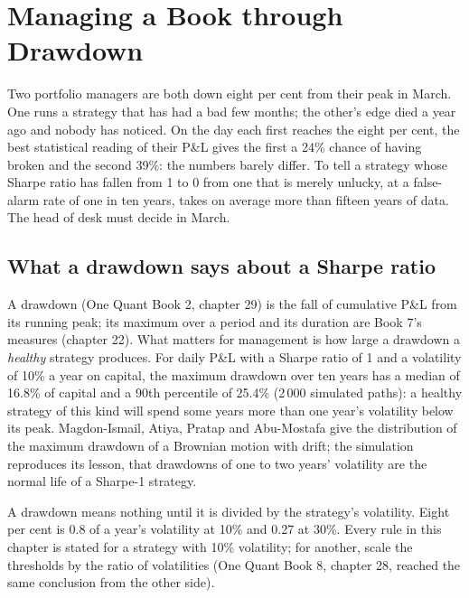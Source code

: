 \chapter{Managing a Book through Drawdown}\label{ch:fm:managing-a-book-through-drawdown}

Two portfolio managers are both down eight per cent from their peak in March. One runs a strategy that has had a bad few months; the other's
edge died a year ago and nobody has noticed. On the day each first reaches the eight per cent, the best statistical reading of their P\&L gives
the first a 24\% chance of having broken and the second 39\%: the numbers barely differ. To tell a strategy whose Sharpe ratio has fallen from 1
to 0 from one that is merely unlucky, at a false-alarm rate of one in ten years, takes on average more than fifteen years of data. The head of desk
must decide in March.

\section{What a drawdown says about a Sharpe ratio}

A drawdown (One Quant Book 2, chapter 29) is the fall of cumulative P\&L from its running peak; its maximum over a period and its duration are
Book 7's measures (chapter 22). What matters for management is how large a drawdown a \emph{healthy} strategy produces. For daily P\&L with a
Sharpe ratio of 1 and a volatility of 10\% a year on capital, the maximum drawdown over ten years has a median of 16.8\% of capital and a
90th percentile of 25.4\% (2\,000 simulated paths): a healthy strategy of this kind will spend some years more than one year's volatility below
its peak. Magdon-Ismail, Atiya, Pratap and Abu-Mostafa give the distribution of the maximum drawdown of a Brownian motion with drift; the
simulation reproduces its lesson, that drawdowns of one to two years' volatility are the normal life of a Sharpe-1 strategy.

\begin{remark}[Units]\label{rem:fm:managing-a-book-through-drawdown:units}
A drawdown means nothing until it is divided by the strategy's volatility. Eight per cent is 0.8 of a year's volatility at 10\% and 0.27 at 30\%.
Every rule in this chapter is stated for a strategy with 10\% volatility; for another, scale the thresholds by the ratio of volatilities (One
Quant Book 8, chapter 28, reached the same conclusion from the other side).
\end{remark}


